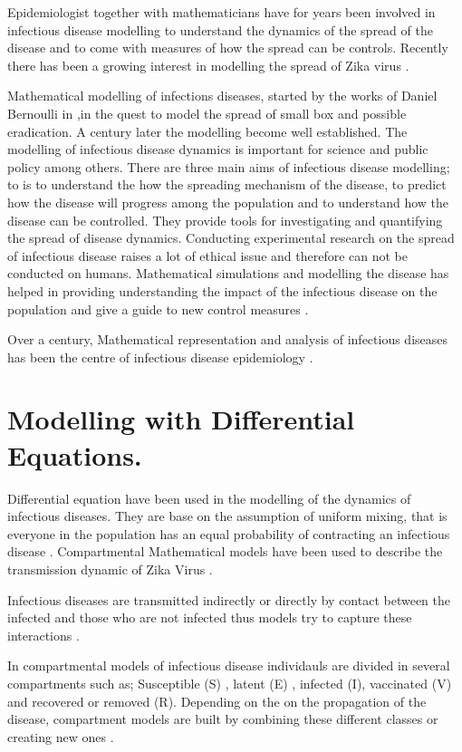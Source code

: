 Epidemiologist together with mathematicians have for years been involved in infectious disease modelling to understand the dynamics of the spread of the disease and to come with measures of how the spread can be controls. Recently there has been a growing interest in modelling the spread of Zika virus \citep{ku2016}.

Mathematical modelling of infections diseases, started by the works of Daniel Bernoulli in \cite{bernoulli1760essai},in the quest to model the spread of small box and possible eradication. A century later the modelling become well established. The modelling of infectious disease dynamics is important for science and public policy among others. There are three main aims of infectious disease modelling; to is to understand the how the spreading mechanism of the disease, to  predict how the disease will progress among the population and to understand how the disease can be controlled. They provide tools for investigating and quantifying the spread of disease dynamics. Conducting experimental research on the spread of infectious disease raises a lot of ethical issue and therefore can not be conducted on humans. Mathematical simulations and modelling the disease has helped in providing understanding the impact of the infectious disease on the population and give a guide to new control measures \citep{ming2016stochastic}.

Over a  century, Mathematical representation and analysis of infectious diseases has been the centre of  infectious disease epidemiology \citep{b2005}. 
\section{Modelling with Differential Equations.}

Differential equation have been used in the modelling of the dynamics of infectious diseases. They are base on the assumption of uniform mixing, that is everyone in the population has an equal probability of contracting an infectious disease \citep{kaplan2002emergency}.
Compartmental Mathematical models have been used to describe the transmission dynamic of Zika Virus \citep{gao2016}.


 Infectious diseases are transmitted indirectly  or directly by contact between the infected and those who are not infected thus models try to capture these interactions \citep{sat}. 
 
In compartmental models of infectious disease individauls are divided in  several compartments such as; Susceptible (S) , latent (E) , infected (I), vaccinated (V) and recovered or removed (R). Depending on the on the propagation of the disease, compartment models are built by combining these different classes or creating new ones \citep{li}.

